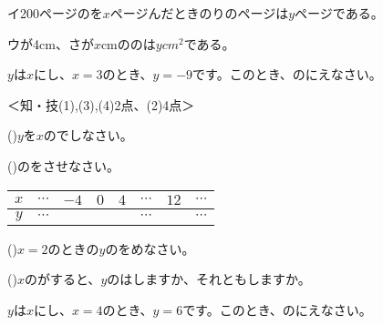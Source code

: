 \documentclass[
  12pt,a4paper,lualatex,ja=standard]{bxjsarticle}
\begin{document}
\begin{flushleft}
イ\hspace{1em}200ページのを$x$ページんだときのりのページは$y$ページである。

ウ\hspace{1em}が4cm、さが$x$cmののは$y$$\si{cm}^2$である。

\vfill

\noindent{} \hspace{1pt}$y$は$x$にし、$x = 3$のとき、$y = -9$です。このとき、のにえなさい。

%
\begin{flushright}%
\footnotesize{＜知・技(1),(3),(4)2点、(2)4点＞}%
\end{flushright}%


()\hspace{2.5pt}$y$を$x$のでしなさい。

()\hspace{2.5pt}のをさせなさい。
\begin{center}
\begin{tabular}{c|ccccccc}
\hline
$x$ & $\cdots$ & $-4$ & $0$ & $4$ & $\cdots$ & $12$ & $\cdots$ \\
\hline
$y$ & $\cdots$ &  &  &  & $\cdots$ & & $\cdots$ \\
\hline
\end{tabular}
\end{center}


()\hspace{2.5pt}$x = 2$のときの$y$のをめなさい。

()\hspace{2.5pt}$x$のがすると、$y$のはしますか、それともしますか。

\setcounter{skaunta}{0}

\vfill

\noindent{} \hspace{1pt}$y$は$x$にし、$x = 4$のとき、$y = 6$です。このとき、のにえなさい。


\end{flushleft}
\end{document}
